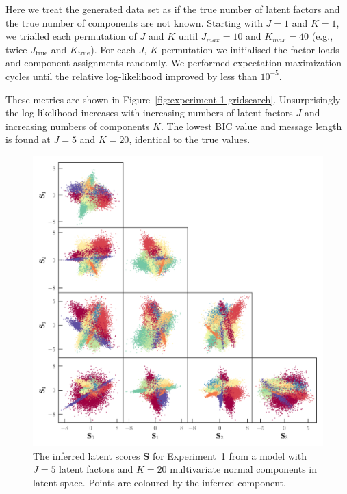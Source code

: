 \documentclass[twocolumn]{aastex62}
\newcommand{\factorscores}{\textbf{S}}
\newcommand{\NumLatentFactors}{J}
\newcommand{\NumComponents}{K}
\begin{document}
Here we treat the generated data set as if the true number of latent factors
and the true number of components are not known. Starting with $\NumLatentFactors = 1$
and $\NumComponents = 1$, we trialled each permutation of $\NumLatentFactors$ and $\NumComponents$
until $\NumLatentFactors_{max} = 10$
and   $\NumComponents_{max} = 40$ (e.g., twice $\NumLatentFactors_\textrm{true}$ and $\NumComponents_\textrm{true}$).
For each $\NumLatentFactors$, $\NumComponents$ permutation we initialised the factor
loads and component assignments randomly. We performed expectation-maximization 
cycles until the relative log-likelihood improved by less than $10^{-5}$. 



These metrics are shown in Figure~\ref{fig:experiment-1-gridsearch}.
Unsurprisingly the log likelihood increases with increasing numbers of latent
factors $\NumLatentFactors$ and increasing numbers of components $\NumComponents$.
The lowest BIC value and message length is found at $\NumLatentFactors = 5$
and $\NumComponents = 20$, identical to the true values.

\begin{figure}
	\includegraphics[width=\textwidth]{experiments/exp1-latent.pdf}
    \caption{The inferred latent scores $\factorscores$ for Experiment~1
    		 from a model with $\NumLatentFactors = 5$ latent factors and
		 	 $\NumComponents = 20$ multivariate normal components in
			 latent space.
             Points are coloured by the inferred component.}
    \label{fig:exp1-latent}
\end{figure}
\end{document}
